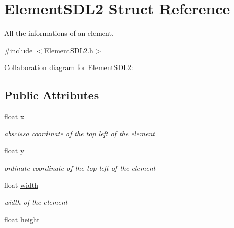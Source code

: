 \hypertarget{structElementSDL2}{}\section{Element\+S\+D\+L2 Struct Reference}
\label{structElementSDL2}


All the informations of an element.  




{\ttfamily \#include $<$Element\+S\+D\+L2.\+h$>$}



Collaboration diagram for Element\+S\+D\+L2\+:
\subsection*{Public Attributes}
\begin{DoxyCompactItemize}
\item 
float \hyperlink{structElementSDL2_a85c4f16793909cb2ab4fc3d1da0ad788}{x}\hypertarget{structElementSDL2_a85c4f16793909cb2ab4fc3d1da0ad788}{}\label{structElementSDL2_a85c4f16793909cb2ab4fc3d1da0ad788}

\begin{DoxyCompactList}\small\item\em abscissa coordinate of the top left of the element \end{DoxyCompactList}\item 
float \hyperlink{structElementSDL2_a07636d9e6dc09c88aaff9062b2db5278}{y}\hypertarget{structElementSDL2_a07636d9e6dc09c88aaff9062b2db5278}{}\label{structElementSDL2_a07636d9e6dc09c88aaff9062b2db5278}

\begin{DoxyCompactList}\small\item\em ordinate coordinate of the top left of the element \end{DoxyCompactList}\item 
float \hyperlink{structElementSDL2_a1dc0d58f7dfad658560111bd8d37a114}{width}\hypertarget{structElementSDL2_a1dc0d58f7dfad658560111bd8d37a114}{}\label{structElementSDL2_a1dc0d58f7dfad658560111bd8d37a114}

\begin{DoxyCompactList}\small\item\em width of the element \end{DoxyCompactList}\item 
float \hyperlink{structElementSDL2_aa85848e696ee9420c7993d395ed883be}{height}\hypertarget{structElementSDL2_aa85848e696ee9420c7993d395ed883be}{}\label{structElementSDL2_aa85848e696ee9420c7993d395ed883be}


\end{DoxyCompactItemize}
